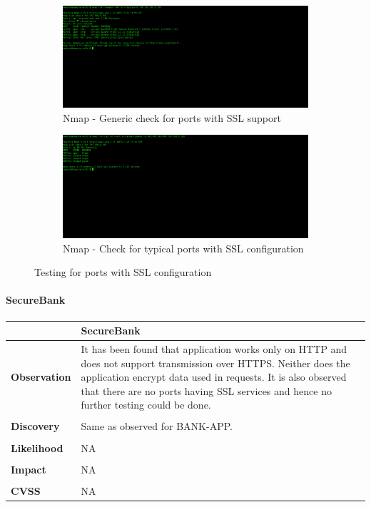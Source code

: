 \begin{figure}[ht]
	\centering
	\begin{subfigure}{.45\textwidth}
		\centering
		\includegraphics[width=.9\linewidth]{figures/OTG-CRYPST-001_1.png}
		\caption{Nmap - Generic check for ports with SSL support}
	\end{subfigure}\hfill%
	\begin{subfigure}{.45\textwidth}
		\centering
		\includegraphics[width=.9\linewidth]{figures/OTG-CRYPST-001_2.png}
		\caption{Nmap - Check for typical ports with SSL configuration}
	\end{subfigure}
	\caption{Testing for ports with SSL configuration}
	\label{fig:nmap_ssl_ports}
\end{figure}

\paragraph{SecureBank} \mbox{}
\begin{longtable*}{p{.20\textwidth} | p{.80\textwidth}}
	\hline
	& \textbf{SecureBank} \\
	\hline
	\textbf{Observation} &
	It has been found that application works only on HTTP and does not support transmission over HTTPS. Neither does the application encrypt data used in requests. It is also observed that there are no ports having SSL services and hence no further testing could be done.
	\\\\
	\textbf{Discovery} &
	Same as observed for BANK-APP.
	\\\\
	\textbf{Likelihood} &
	NA
	\\\\
	\textbf{Impact} &
	NA
	\\\\
	\textbf{CVSS} &
	NA
	\\
	\hline
\end{longtable*}
\clearpage